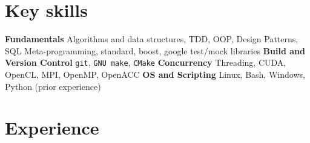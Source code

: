 \documentclass[]{twentysecondscv}
\begin{document}


\section{Key skills}
\begin{twentyshort}
  \twentyitemshort
	{\small \textbf{\color{darkgray}Fundamentals}}
	{\small Algorithms and data structures, TDD, OOP, Design Patterns, SQL}
  \twentyitemshort
    {\small \textbf{\color{darkgray}{C/C++11 and newer}}}
    {\small Meta-programming, standard,  boost, google test/mock libraries}
   \twentyitemshort
    {\small \textbf{\color{darkgray}Build and Version Control}}
    {\small  \texttt{git}, \texttt{GNU make}, \texttt{CMake}}
  \twentyitemshort
    {\small \textbf{\color{darkgray}Concurrency}}
    {\small  Threading, CUDA, OpenCL, MPI, OpenMP, OpenACC}
  \twentyitemshort
	{\small \textbf{\color{darkgray}OS and Scripting}}
	{\small  Linux, Bash, Windows, Python (prior experience)}
\end{twentyshort}



\section{Experience}
\end{document}
